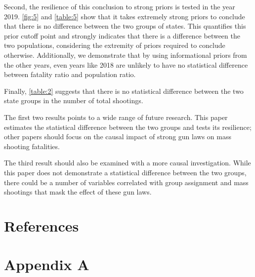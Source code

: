 \documentclass{article}
\begin{document}
Second, the resilience of this conclusion to strong priors is tested in the year 2019. \ref{fig:5} and \ref{table:5} show that it takes extremely strong priors to conclude that there is no difference between the two groups of states. This quantifies this prior cutoff point and strongly indicates that there is a difference between the two populations, considering the extremity of priors required to conclude otherwise. Additionally, we demonstrate that by using informational priors from the other years, even years like 2018 are unlikely to have no statistical difference between fatality ratio and population ratio.

Finally, \ref{table:2} suggests that there is no statistical difference between the two state groups in the number of total shootings.

The first two results points to a wide range of future research. This paper estimates the statistical difference between the two groups and tests its resilience; other papers should focus on the causal impact of strong gun laws on mass shooting fatalities. 

The third result should also be examined with a more causal investigation. While this paper does not demonstrate a statistical difference between the two groups, there could be a number of variables correlated with group assignment and mass shootings that mask the effect of these gun laws. 

\section{References}



\section{Appendix A}
\end{document}
